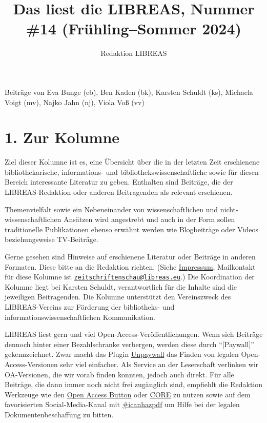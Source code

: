 \documentclass[a4paper,
fontsize=11pt,
oneside,
numbers=noperiodatend,
parskip=half-,
bibliography=totoc,
final
]{scrartcl}
\title{\LARGE{Das liest die LIBREAS, Nummer \#14 (Frühling–Sommer 2024)}}%
\author{Redaktion LIBREAS} %
\date{}
\begin{document}
\maketitle
\thispagestyle{fancyplain} 


Beiträge von Eva Bunge (eb), Ben Kaden (bk), Karsten Schuldt (ks),
Michaela Voigt (mv), Najko Jahn (nj), Viola Voß (vv)

\hypertarget{zur-kolumne}{%
\section{1. Zur Kolumne}\label{zur-kolumne}}

Ziel dieser Kolumne ist es, eine Übersicht über die in der letzten Zeit
erschienene bibliothekarische, informations- und
bibliothekswissenschaftliche sowie für diesen Bereich interessante
Literatur zu geben. Enthalten sind Beiträge, die der LIBREAS-Redaktion
oder anderen Beitragenden als relevant erschienen.

Themenvielfalt sowie ein Nebeneinander von wissenschaftlichen und
nicht-wissenschaftlichen Ansätzen wird angestrebt und auch in der Form
sollen traditionelle Publikationen ebenso erwähnt werden wie
Blogbeiträge oder Videos beziehungsweise TV-Beiträge.

Gerne gesehen sind Hinweise auf erschienene Literatur oder Beiträge in
anderen Formaten. Diese bitte an die Redaktion richten. (Siehe
\href{http://libreas.eu/about/}{Impressum}, Mailkontakt für diese
Kolumne ist
\href{mailto:zeitschriftenschau@libreas.eu}{\nolinkurl{zeitschriftenschau@libreas.eu}}.)
Die Koordination der Kolumne liegt bei Karsten Schuldt, verantwortlich
für die Inhalte sind die jeweiligen Beitragenden. Die Kolumne
unterstützt den Vereinszweck des LIBREAS-Vereins zur Förderung der
bibliotheks- und informationswissenschaftlichen Kommunikation.

LIBREAS liest gern und viel Open-Access-Veröffentlichungen. Wenn sich
Beiträge dennoch hinter einer Bezahlschranke verbergen, werden diese
durch \enquote{{[}Paywall{]}} gekennzeichnet. Zwar \linebreak macht das Plugin
\href{http://unpaywall.org/}{Unpaywall} das Finden von legalen
Open-Access-Versionen sehr viel einfacher. Als Service an der
Leserschaft verlinken wir OA-Versionen, die wir vorab finden konnten,
jedoch auch direkt. Für alle Beiträge, die dann immer noch nicht frei
zugänglich sind, empfiehlt die Redaktion Werkzeuge wie den
\href{https://openaccessbutton.org/}{Open Access Button} oder
\href{https://core.ac.uk/services/discovery/}{CORE} zu nutzen sowie auf
dem favorisierten Social-Media-Kanal mit
\href{https://mastodon.social/tags/icanhazpdf}{\#icanhazpdf} um Hilfe
bei der legalen Dokumentenbeschaffung zu bitten.
\end{document}
